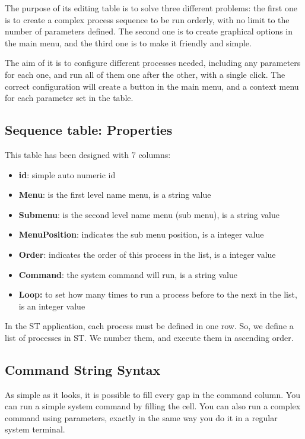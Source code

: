 \documentclass[a4paper,10pt]{article}
\begin{document}
The purpose of its editing table is to solve three different problems: the first one is to create a complex process sequence to be run orderly, with no limit to the number of parameters defined. The second one is to create graphical options in the main menu, and the third one is to make it friendly and simple.

The aim of it is to configure different processes needed, including any parameters for each one, and run all of them one after the other, with a single click. The correct configuration will create a button in the main menu, and a context menu for each parameter set in the table.

\subsection{Sequence table: Properties}
This table has been designed with 7 columns:

\begin{itemize}
    \item \textbf{id}: simple auto numeric id
    \item \textbf{Menu}: is the first level name menu, is a string value
    \item \textbf{Submenu}: is the second level name menu (sub menu), is a string value
    \item \textbf{MenuPosition}: indicates the sub menu position, is a integer value
    \item \textbf{Order}: indicates the order of this process in the list, is a integer value
    \item \textbf{Command}: the system command will run, is a string value
    \item \textbf{Loop:} to set how many times to run a process before to the next in the list, is an integer value
\end{itemize}

In the ST application, each process must be defined in one row. So, we define a list of processes in ST. We number them, and execute them in ascending order.

\subsection{Command String Syntax}

As simple as it looks, it is possible to fill every gap in the command column. You can run a simple system command by filling the cell. You can also run a complex command using parameters, exactly in the same way you do it in a regular system terminal.
\end{document}
